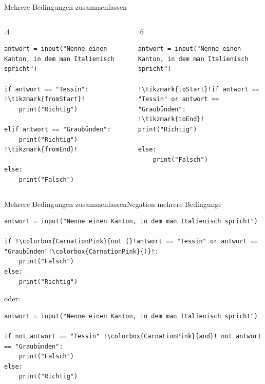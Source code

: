 \begin{frame}[fragile]{Mehrere Bedingungen zusammenfassen}
\begin{columns}
\begin{column}{.4\textwidth}
\begin{lstlisting}[escapechar=!,basicstyle=\tiny\ttfamily]
antwort = input("Nenne einen Kanton, in dem man Italienisch spricht")

if antwort == "Tessin":         !\tikzmark{fromStart}!
    print("Richtig")

elif antwort == "Graubünden": 
    print("Richtig")            !\tikzmark{fromEnd}!

else:
    print("Falsch")
\end{lstlisting}
\end{column}
\begin{column}{.6\textwidth}
\begin{lstlisting}[escapechar=!,basicstyle=\tiny\ttfamily]
antwort = input("Nenne einen Kanton, in dem man Italienisch spricht")

!\tikzmark{toStart}!if antwort == "Tessin" or antwort == "Graubünden":
!\tikzmark{toEnd}!    print("Richtig")

else:
    print("Falsch")
\end{lstlisting}
\end{column}
\end{columns}

\end{frame}

\begin{frame}[fragile]{Mehrere Bedingungen zusammenfassen}{Negation mehrere Bedingunge}

\begin{lstlisting}[escapechar=!]
antwort = input("Nenne einen Kanton, in dem man Italienisch spricht")

if !\colorbox{CarnationPink}{not (}!antwort == "Tessin" or antwort == "Graubünden"!\colorbox{CarnationPink}{)}!:
    print("Falsch")
else:
    print("Richtig")
\end{lstlisting}

oder:

\begin{lstlisting}[escapechar=!]
antwort = input("Nenne einen Kanton, in dem man Italienisch spricht")

if not antwort == "Tessin" !\colorbox{CarnationPink}{and}! not antwort == "Graubünden":
    print("Falsch")
else:
    print("Richtig")
\end{lstlisting}
\end{frame}

